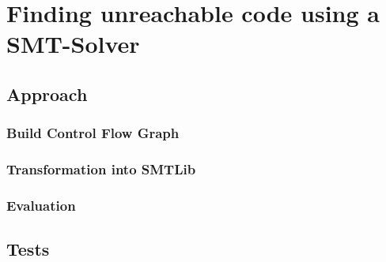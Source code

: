 \chapter{Finding unreachable code using a SMT-Solver}
\label{cha:finding unreachable code using a smt-solver}

\section{Approach}
\subsection{Build Control Flow Graph}
\subsection{Transformation into SMTLib}
\subsection{Evaluation}
\section{Tests}
